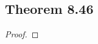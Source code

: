 \documentclass[../../main.tex]{subfiles}
\begin{document}
\subsection{Theorem 8.46}
\begin{wts}

\end{wts}
\begin{proof}

\end{proof}
\end{document}
